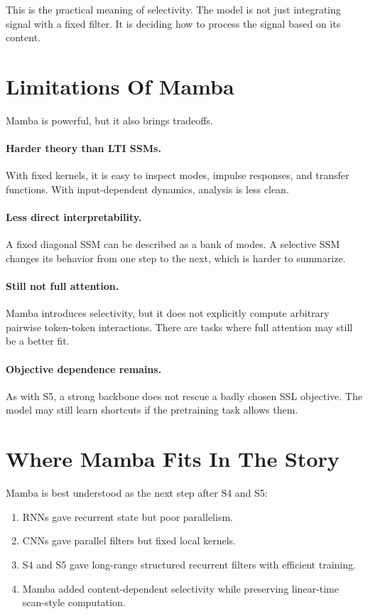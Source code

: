 This is the practical meaning of selectivity. The model is not just integrating signal
with a fixed filter. It is deciding how to process the signal based on its content.

\section{Limitations Of Mamba}

Mamba is powerful, but it also brings tradeoffs.

\paragraph{Harder theory than LTI SSMs.}
With fixed kernels, it is easy to inspect modes, impulse responses, and transfer functions.
With input-dependent dynamics, analysis is less clean.

\paragraph{Less direct interpretability.}
A fixed diagonal SSM can be described as a bank of modes. A selective SSM changes its
behavior from one step to the next, which is harder to summarize.

\paragraph{Still not full attention.}
Mamba introduces selectivity, but it does not explicitly compute arbitrary pairwise
token-token interactions. There are tasks where full attention may still be a better fit.

\paragraph{Objective dependence remains.}
As with S5, a strong backbone does not rescue a badly chosen SSL objective. The model may
still learn shortcuts if the pretraining task allows them.

\section{Where Mamba Fits In The Story}

Mamba is best understood as the next step after S4 and S5:

\begin{enumerate}
  \item RNNs gave recurrent state but poor parallelism.
  \item CNNs gave parallel filters but fixed local kernels.
  \item S4 and S5 gave long-range structured recurrent filters with efficient training.
  \item Mamba added content-dependent selectivity while preserving linear-time scan-style
  computation.
\end{enumerate}

